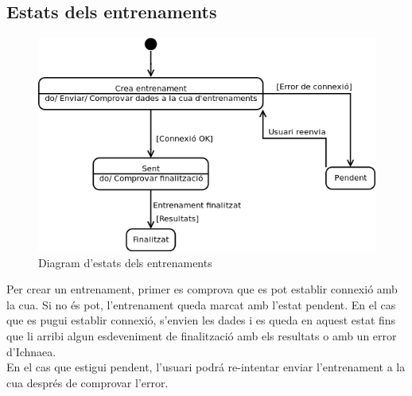 \subsection{Estats dels entrenaments}
\begin{figure}[H]
  \centering
  \includegraphics[scale=0.4]{img/specification/StatesTraining.png}
  \caption{Diagram d'estats dels entrenaments}
  \label{fig:statestraining}
\end{figure}
Per crear un entrenament, primer es comprova que es pot establir connexi\'{o} amb la cua. Si no \'{e}s pot, l'entrenament queda marcat amb l'estat pendent. En el cas que es pugui establir connexi\'{o}, s'envien les dades i es queda en aquest estat fins que li arribi algun esdeveniment de finalitzaci\'{o} amb els resultats o amb un error d'Ichnaea.\\

En el cas que estigui pendent, l'usuari podr\'{a} re-intentar enviar l'entrenament a la cua despr\'{e}s de comprovar l'error.

